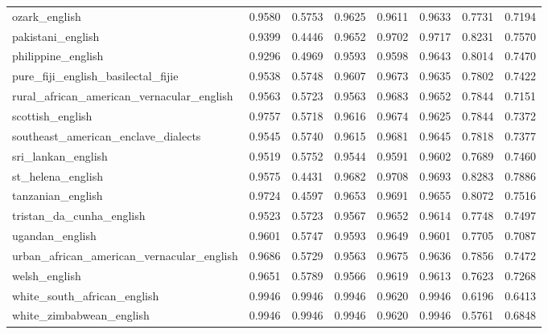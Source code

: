\begin{landscape}
\begin{longtable}{lccccccc}
ozark\_english & 0.9580 & 0.5753 & 0.9625 & 0.9611 & 0.9633 & 0.7731 & 0.7194 \\
pakistani\_english & 0.9399 & 0.4446 & 0.9652 & 0.9702 & 0.9717 & 0.8231 & 0.7570 \\
philippine\_english & 0.9296 & 0.4969 & 0.9593 & 0.9598 & 0.9643 & 0.8014 & 0.7470 \\
pure\_fiji\_english\_basilectal\_fijie & 0.9538 & 0.5748 & 0.9607 & 0.9673 & 0.9635 & 0.7802 & 0.7422 \\
rural\_african\_american\_vernacular\_english & 0.9563 & 0.5723 & 0.9563 & 0.9683 & 0.9652 & 0.7844 & 0.7151 \\
scottish\_english & 0.9757 & 0.5718 & 0.9616 & 0.9674 & 0.9625 & 0.7844 & 0.7372 \\
southeast\_american\_enclave\_dialects & 0.9545 & 0.5740 & 0.9615 & 0.9681 & 0.9645 & 0.7818 & 0.7377 \\
sri\_lankan\_english & 0.9519 & 0.5752 & 0.9544 & 0.9591 & 0.9602 & 0.7689 & 0.7460 \\
st\_helena\_english & 0.9575 & 0.4431 & 0.9682 & 0.9708 & 0.9693 & 0.8283 & 0.7886 \\
tanzanian\_english & 0.9724 & 0.4597 & 0.9653 & 0.9691 & 0.9655 & 0.8072 & 0.7516 \\
tristan\_da\_cunha\_english & 0.9523 & 0.5723 & 0.9567 & 0.9652 & 0.9614 & 0.7748 & 0.7497 \\
ugandan\_english & 0.9601 & 0.5747 & 0.9593 & 0.9649 & 0.9601 & 0.7705 & 0.7087 \\
urban\_african\_american\_vernacular\_english & 0.9686 & 0.5729 & 0.9563 & 0.9675 & 0.9636 & 0.7856 & 0.7472 \\
welsh\_english & 0.9651 & 0.5789 & 0.9566 & 0.9619 & 0.9613 & 0.7623 & 0.7268 \\
white\_south\_african\_english & 0.9946 & 0.9946 & 0.9946 & 0.9620 & 0.9946 & 0.6196 & 0.6413 \\
white\_zimbabwean\_english & 0.9946 & 0.9946 & 0.9946 & 0.9620 & 0.9946 & 0.5761 & 0.6848 \\
\bottomrule
\end{longtable}
\end{landscape}